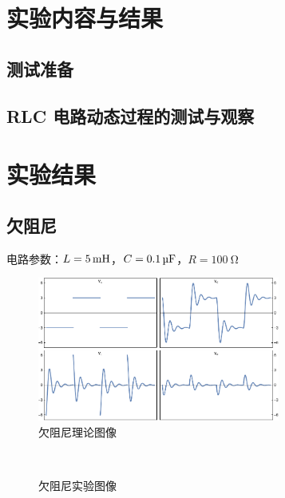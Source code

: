 \documentclass[a4paper,utf8]{article}
\begin{document}
\section{实验内容与结果}
    \subsection{测试准备}
    \subsection{RLC 电路动态过程的测试与观察}
\clearpage
\section{实验结果}
    \subsection{欠阻尼}
    电路参数：$L= \SI{5}{\mH}$，$C= \SI{0.1}{\uF}$，$R=\SI{100}{\ohm}$
    \begin{figure}[!ht]
        \includegraphics[width=0.71\textwidth]{1q.pdf}
        \caption{欠阻尼理论图像}
    \end{figure}
    \begin{figure}[!ht]
        \hspace{6mm}
        \\
        \hspace{6mm}
        \caption{欠阻尼实验图像}
    \end{figure}\par
    \clearpage
\end{document}
